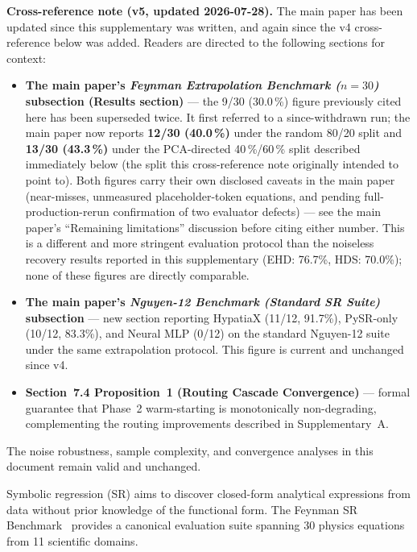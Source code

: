 \documentclass[twoside,11pt]{article}
\begin{document}
\medskip
\noindent\textbf{Cross-reference note (v5, updated 2026-07-28).}
The main paper has been updated since this supplementary was written, and
again since the v4 cross-reference below was added. Readers are directed
to the following sections for context:
\begin{itemize}
  \item \textbf{The main paper's \emph{Feynman Extrapolation Benchmark ($n=30$)} subsection (Results section)} --- the
    9/30 (30.0\,\%) figure previously cited here has been superseded twice.
    It first referred to a since-withdrawn run; the main paper now reports
    \textbf{12/30 (40.0\,\%)} under the random 80/20 split and
    \textbf{13/30 (43.3\,\%)} under the PCA-directed 40\,\%/60\,\% split
    described immediately below (the split this cross-reference note
    originally intended to point to). Both figures carry their own
    disclosed caveats in the main paper (near-misses, unmeasured
    placeholder-token equations, and pending full-production-rerun
    confirmation of two evaluator defects) --- see the main paper's
    ``Remaining limitations'' discussion before citing either number.
    This is a different and more stringent evaluation protocol
    than the noiseless recovery results reported in this supplementary
    (EHD: 76.7\%, HDS: 70.0\%); none of these figures are directly comparable.
  \item \textbf{The main paper's \emph{Nguyen-12 Benchmark (Standard SR Suite)} subsection} --- new section reporting
    HypatiaX (11/12, 91.7\%), PySR-only (10/12, 83.3\%), and Neural MLP
    (0/12) on the standard Nguyen-12 suite under the same extrapolation
    protocol. This figure is current and unchanged since v4.
  \item \textbf{Section~7.4 Proposition~1 (Routing Cascade Convergence)} --- formal
    guarantee that Phase~2 warm-starting is monotonically non-degrading,
    complementing the routing improvements described in Supplementary~A.
\end{itemize}
The noise robustness, sample complexity, and convergence analyses in this
document remain valid and unchanged.

Symbolic regression (SR) aims to discover closed-form analytical expressions
from data without prior knowledge of the functional form.  The Feynman SR
Benchmark~\citep{udrescu2020ai} provides a canonical evaluation suite spanning
30 physics equations from 11 scientific domains.
\end{document}
